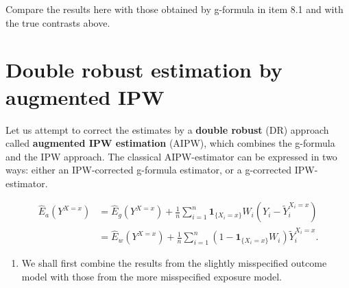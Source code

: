 \documentclass[
]{book}
\newenvironment{Shaded}{\begin{snugshade}}{\end{snugshade}}
\newcommand{\DecValTok}[1]{\textcolor[rgb]{0.00,0.00,0.81}{#1}}
\newcommand{\FunctionTok}[1]{\textcolor[rgb]{0.13,0.29,0.53}{\textbf{#1}}}
\newcommand{\NormalTok}[1]{#1}
\newcommand{\OtherTok}[1]{\textcolor[rgb]{0.56,0.35,0.01}{#1}}
\newcommand{\SpecialCharTok}[1]{\textcolor[rgb]{0.81,0.36,0.00}{\textbf{#1}}}
\providecommand{\tightlist}{%
  \setlength{\itemsep}{0pt}\setlength{\parskip}{0pt}}
\begin{document}
Compare the results here with those obtained by
g-formula in item 8.1
and with the true contrasts above.

\section{Double robust estimation by augmented IPW}\label{double-robust-estimation-by-augmented-ipw}

Let us attempt to correct the estimates by a \textbf{double
robust} (DR) approach
called \textbf{augmented IPW estimation} (AIPW), which
combines the g-formula and
the IPW approach. The classical
AIPW-estimator can be expressed in two ways:
either an IPW-corrected g-formula estimator, or a g-corrected
IPW-estimator.

\[
\begin{aligned}
 \widehat{E}_a(Y^{X=x}) 
       & = \widehat{E}_g(Y^{X=x}) +
\frac{1}{n} \sum_{i=1}^n  {\mathbf 1}_{\{X_i=x\}} W_i 
                   ( Y_i - \widetilde{Y}_i^{X_i=x} )   \\
       & = \widehat{E}_w(Y^{X=x}) +
\frac{1}{n} \sum_{i=1}^n ( 1 - {\mathbf 1}_{\{X_i=x\}} W_i ) 
                      \widetilde{Y}_i^{X_i=x}.
\end{aligned}
\]

\begin{enumerate}
\def\labelenumi{\arabic{enumi}.}
\tightlist
\item
  We shall first combine the results from the slightly
  misspecified outcome model with those from the more
  misspecified exposure model.
\end{enumerate}

\begin{Shaded}
\end{Shaded}
\end{document}

